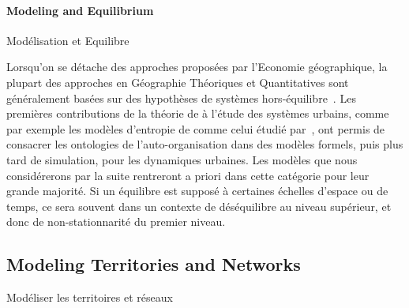 \paragraph{Modeling and Equilibrium}{Modélisation et Equilibre}

Lorsqu'on se détache des approches proposées par l'Economie géographique, la plupart des approches en Géographie Théoriques et Quantitatives sont généralement basées sur des hypothèses de systèmes hors-équilibre~\cite{pumain2017geography}. Les premières contributions de la théorie de  à l'étude des systèmes urbains, comme par exemple les modèles d'entropie de  comme celui étudié par~\cite{pumain1984vers}, ont permis de consacrer les ontologies de l'auto-organisation dans des modèles formels, puis plus tard de simulation, pour les dynamiques urbaines. Les modèles que nous considérerons par la suite rentreront a priori dans cette catégorie pour leur grande majorité. Si un équilibre est supposé à certaines échelles d'espace ou de temps, ce sera souvent dans un contexte de déséquilibre au niveau supérieur, et donc de non-stationnarité du premier niveau.




\subsection{Modeling Territories and Networks}{Modéliser les territoires et réseaux}


